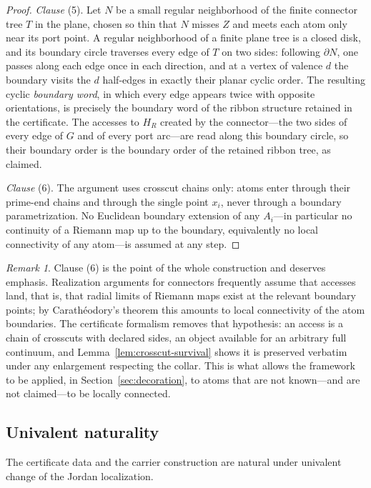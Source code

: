 \documentclass[11pt,reqno]{amsart}
\theoremstyle{definition}
\theoremstyle{remark}
\newtheorem{remark}[theorem]{Remark}
\begin{document}
\begin{proof}
\emph{Clause} (5).  Let $N$ be a small regular neighborhood of the finite
connector tree $T$ in the plane, chosen so thin that $N$ misses $Z$ and
meets each atom only near its port point.  A regular neighborhood of a finite plane tree is a closed
disk, and its boundary circle traverses every edge of $T$ on two sides:
following $\partial N$, one passes along each edge once in each
direction, and at a vertex of valence $d$ the boundary visits the $d$
half-edges in exactly their planar cyclic order.  The resulting cyclic
\emph{boundary word}, in which every edge appears twice with opposite
orientations, is precisely the boundary word of the ribbon structure
retained in the certificate.  The accesses to $H_R$ created by the
connector---the two sides of every edge of $G$ and of every port
arc---are read along this boundary circle, so their boundary order is the
boundary order of the retained ribbon tree, as claimed.

\emph{Clause} (6).  The argument uses crosscut chains only: atoms enter
through their prime-end chains and through the single point $x_i$, never
through a boundary parametrization.  No Euclidean boundary extension of
any $A_i$---in particular no continuity of a Riemann map up to the
boundary, equivalently no local connectivity of any atom---is assumed at
any step.
\end{proof}

\begin{remark}\label{rem:C-no-lc}
Clause (6) is the point of the whole construction and deserves emphasis.
Realization arguments for connectors frequently assume that accesses
land, that is, that radial limits of Riemann maps exist at the relevant
boundary points; by Carath\'eodory's theorem this amounts to local
connectivity of the atom boundaries.  The certificate formalism removes
that hypothesis: an access is a chain of crosscuts with declared sides,
an object available for an arbitrary full continuum, and
Lemma~\ref{lem:crosscut-survival} shows it is preserved verbatim under
any enlargement respecting the collar.  This is what allows the framework
to be applied, in Section~\ref{sec:decoration}, to atoms that are not
known---and are not claimed---to be locally connected.
\end{remark}

\subsection*{Univalent naturality}
The certificate data and the carrier construction are natural under
univalent change of the Jordan localization.
\end{document}
